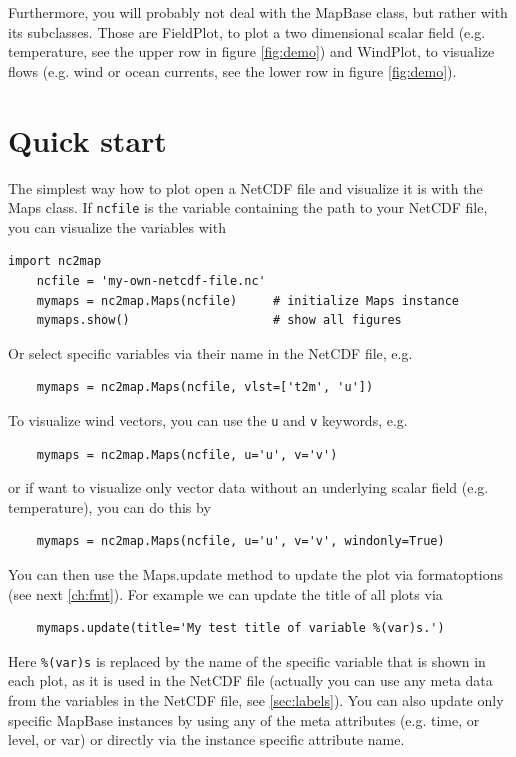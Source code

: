 Furthermore, you will probably not deal with the \gls{MapBase} class, but rather with its subclasses. Those are \gls{FieldPlot}, to plot a two dimensional scalar field (e.g. temperature, see the upper row in figure \ref{fig:demo}) and \gls{WindPlot}, to visualize flows (e.g. wind or ocean currents, see the lower row in figure \ref{fig:demo}).

\section{Quick start} \label{sec:basic_init}
The simplest way how to plot open a NetCDF file and visualize it is with the \gls{Maps} class. If \lstinline|ncfile| is the variable containing the path to your NetCDF file, you can visualize the variables with
\begin{lstlisting}[label={lst:basic_init}, caption={Basic initialization of a \gls*{Maps} instance}]
	import nc2map
	ncfile = 'my-own-netcdf-file.nc'
	mymaps = nc2map.Maps(ncfile)     # initialize Maps instance
	mymaps.show()                    # show all figures
\end{lstlisting}
Or select specific variables via their name in the NetCDF file, e.g.
\begin{lstlisting}
	mymaps = nc2map.Maps(ncfile, vlst=['t2m', 'u'])
\end{lstlisting}
To visualize wind vectors, you can use the \lstinline|u| and \lstinline|v| keywords, e.g.
\begin{lstlisting}
	mymaps = nc2map.Maps(ncfile, u='u', v='v')
\end{lstlisting}
or if want to visualize only vector data without an underlying scalar field (e.g. temperature), you can do this by
\begin{lstlisting}
	mymaps = nc2map.Maps(ncfile, u='u', v='v', windonly=True)
\end{lstlisting}
You can then use the \gls{Maps.update} method to update the plot via formatoptions (see next \autoref{ch:fmt}). For example we can update the title of all plots via
\begin{lstlisting}
	mymaps.update(title='My test title of variable %(var)s.')
\end{lstlisting}
Here \lstinline|%(var)s| is replaced by the name of the specific variable that is shown in each plot, as it is used in the NetCDF file (actually you can use any meta data from the variables in the NetCDF file, see \autoref{sec:labels}). You can also update only specific \gls{MapBase} instances by using any of the meta attributes (e.g. \gls{time}, or \gls{level}, or \gls{var}) or directly via the instance specific attribute \gls{name}.


